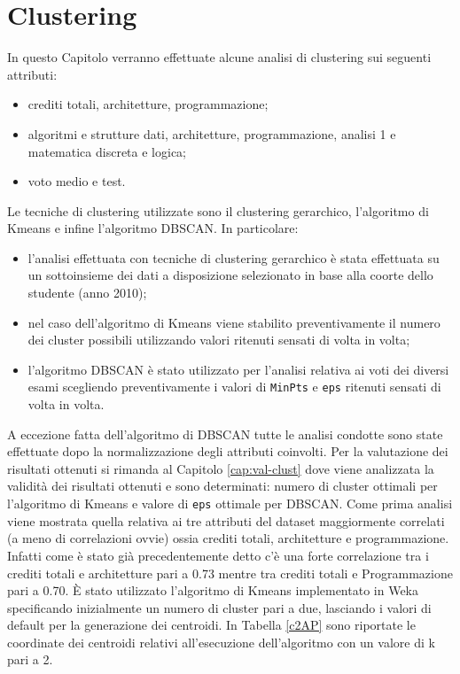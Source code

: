 \documentclass[12pt]{article}
\begin{document}
\section{Clustering}
\label{cap:clust}
In questo Capitolo verranno effettuate alcune analisi di clustering sui se\-guenti attributi:
\begin{itemize}
\item crediti totali, architetture, programmazione;
\item algoritmi e strutture dati, architetture, programmazione, analisi 1 e matematica discreta e logica;
\item voto medio e test.
\end{itemize}
Le tecniche di clustering utilizzate sono il clustering gerarchico, l'algori\-tmo di Kmeans e infine l'algoritmo DBSCAN. In particolare:
\begin{itemize}
\item l'analisi effettuata con tecniche di clustering gerarchico è stata effet\-tuata su un sottoinsieme dei dati a disposizione selezionato in base alla coorte dello studente (anno 2010);
\item nel caso dell'algoritmo di Kmeans viene stabilito preventivamente il numero dei cluster possibili utilizzando valori ritenuti sensati di volta in volta;
\item l'algoritmo DBSCAN è stato utilizzato per l'analisi relativa ai voti dei diversi esami scegliendo preventivamente i valori di \texttt{MinPts} e \texttt{eps} ritenuti sensati di volta in volta.
\end{itemize}
A eccezione fatta dell'algoritmo di DBSCAN tutte le analisi condotte sono state effettuate dopo la normalizzazione degli attributi coinvolti. 
Per la valutazione dei risultati ottenuti si rimanda al Capitolo \ref{cap:val-clust} dove viene analiz\-zata la validità dei risultati ottenuti e sono determinati: 
numero di cluster ottimali per l'algoritmo di Kmeans e valo\-re di \texttt{eps} ottimale per DBSCAN.
Come prima analisi viene mostrata quella relativa ai tre attributi del dataset maggiormente correlati (a meno di 
correlazioni ovvie) ossia crediti totali, architetture e programmazione.
Infatti come è stato già precedentemente detto c'è una forte correlazione tra i crediti totali e architetture pari a 0.73 mentre tra crediti totali e Programmazione pari a 0.70.
È stato utilizzato l'algoritmo di Kmeans implementato in Weka specificando inizialmente un numero di cluster pari a due, lasciando i valori di default per la generazione dei centroidi.
In Tabella \ref{c2AP} sono riporta\-te le coordinate dei centroidi relativi all'esecuzione dell'algoritmo con un valore di k pari a 2.
\end{document}
